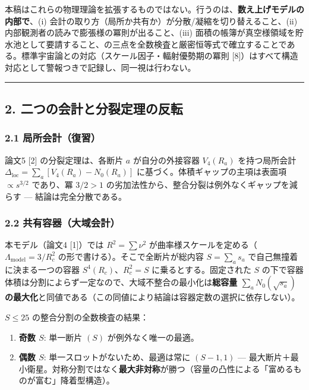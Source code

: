 \documentclass[
]{ltjsarticle}
\providecommand{\tightlist}{%
  \setlength{\itemsep}{0pt}\setlength{\parskip}{0pt}}
\begin{document}
本稿はこれらの物理理論を拡張するものではない。行うのは、\textbf{数え上げモデルの内部で}、(i)
会計の取り方（局所か共有か）が分散/凝縮を切り替えること、(ii)
内部観測者の読みで膨張様の冪則が出ること、(iii)
面積の帳簿が真空様領域を貯水池として要請すること、の三点を全数検査と厳密恒等式で確立することである。標準宇宙論との対応（スケール因子・輻射優勢期の冪則
{[}8{]}）はすべて構造対応として警報つきで記録し、同一視は行わない。

\begin{center}\rule{0.5\linewidth}{0.5pt}\end{center}

\subsection{2.
二つの会計と分裂定理の反転}\label{ux4e8cux3064ux306eux4f1aux8a08ux3068ux5206ux88c2ux5b9aux7406ux306eux53cdux8ee2}

\subsubsection{2.1
局所会計（復習）}\label{ux5c40ux6240ux4f1aux8a08ux5fa9ux7fd2}

論文5 {[}2{]} の分裂定理は、各断片 \(a\) が自分の外接容器 \(V_4(R_a)\)
を持つ局所会計 \(\Delta_{\mathrm{loc}}=\sum_a[V_4(R_a)-N_0(R_a)]\)
に基づく。体積ギャップの主項は表面項 \(\propto s^{3/2}\) であり、冪
\(3/2>1\) の劣加法性から、整合分裂は例外なくギャップを減らす ---
結論は完全分散である。

\subsubsection{2.2
共有容器（大域会計）}\label{ux5171ux6709ux5bb9ux5668ux5927ux57dfux4f1aux8a08}

本モデル（論文4 {[}1{]}）では \(R^2=\sum\nu^2\)
が曲率様スケールを定める（\(\Lambda_{\mathrm{model}}=3/R_c^2\)
の形で書ける）。そこで全断片が総内容 \(S=\sum_a s_a\)
で自己無撞着に決まる一つの容器 \(S^4(R_c)\)、\(R_c^2=S\)
に乗るとする。固定された \(S\)
の下で容器体積は分割によらず一定なので、大域不整合の最小化は\textbf{総容量
\(\sum_a N_0(\sqrt{s_a})\)
の最大化}と同値である（この同値により結論は容器定数の選択に依存しない）。

\(S\le25\) の整合分割の全数検査の結果：

\begin{enumerate}
\def\labelenumi{\arabic{enumi}.}
\tightlist
\item
  \textbf{奇数 \(S\)}: 単一断片 \((S)\) が例外なく唯一の最適。
\item
  \textbf{偶数 \(S\)}: 単一スロットがないため、最適は常に \((S-1,1)\)
  ---
  最大断片＋最小衛星。対称分割ではなく\textbf{最大非対称}が勝つ（容量の凸性による「富めるものが富む」降着型構造）。
\end{enumerate}
\end{document}
